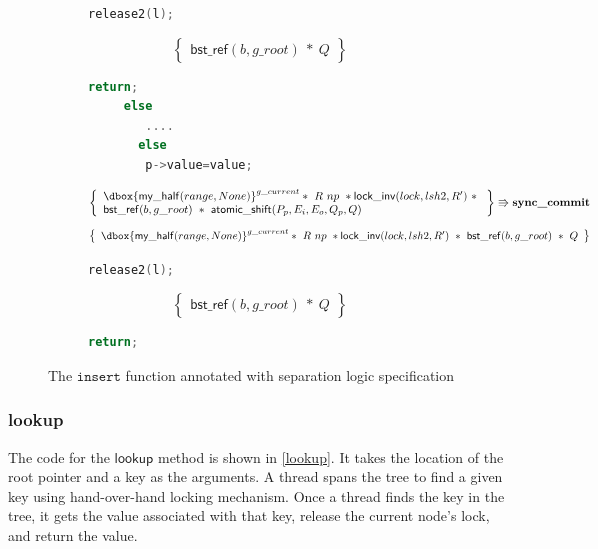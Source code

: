 \documentclass[acmsmall,screen]{acmart}\settopmatter{printfolios=true}
\newcommand\dboxed[1]{\dbox{\ensuremath{#1}}}
\newcommand{\ghost}[2]{\ensuremath{\dboxed{#1}^{#2}}}
\newcommand{\nodeboxrep}{\ensuremath{\mathsf{bst\_ref}}}
\begin{document}
\begin{figure}[htp]
\begin{subfigure}[t]{1\textwidth}
 \vspace*{-10pt}
        \begin{lstlisting}[language = C,numbers = none]
      release2(l);
         \end{lstlisting}
       $$\left\{\begin{array}{l} \nodeboxrep(b,g\_root)\ *\ Q\end{array}\right\}$$
        \vspace*{-10pt}
         \begin{lstlisting}[language = C,numbers = none]
      return;
     else 
        ....
       else 
      	p->value=value;
      	\end{lstlisting} 
$$\left\{\begin{array}{l} \ghost{\mathsf{my\_half}(range,None)}{g\_current}*\ R\ np\ *
\mathsf{lock\_inv}(lock,lsh2,R')\ *\ \\\nodeboxrep(b,g\_root)\ *\ \mathsf{atomic\_shift}(P_p,E_i,E_o,Q_p,Q)\end{array}\right\} \Rrightarrow{\textbf{sync\_commit}}$$
$$\left\{\begin{array}{l} \ghost{\mathsf{my\_half}(range,None)}{g\_current}*\ R\ np\ *\mathsf{lock\_inv}(lock,lsh2,R')\ *\ \nodeboxrep(b,g\_root)\ *\ Q\end{array}\right\}$$
         \vspace*{-10pt}
      	\begin{lstlisting}[language = C, numbers = none]
        release2(l);
        \end{lstlisting}
        $$\left\{\begin{array}{l}  \nodeboxrep(b,g\_root)\ *\ Q\end{array}\right\}$$
         \vspace*{-10pt}
        \begin{lstlisting}[language = C, numbers = none] 
      	return;
\end{lstlisting}
\end{subfigure}
\caption{The $\texttt{insert}$ function annotated with separation logic specification}
\label{insertproof}
\end{figure} 


\subsubsection{lookup}

The code for the $\mathsf{lookup}$ method is shown in \ref{lookup}. It takes the location of the root pointer and a key as the arguments. A thread spans the tree to find a given key using hand-over-hand locking mechanism. Once a thread finds the key in the tree, it gets the value associated with that key, release the current node's lock, and return the value. 
\end{document}

